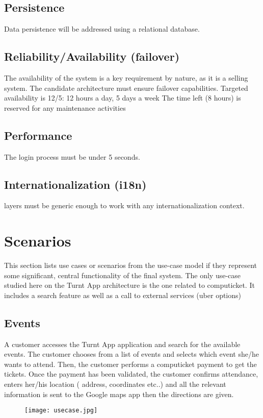 \documentclass[10pt,a4paper]{article}
\begin{document}
\subsection{Persistence }

Data persistence will be addressed using a relational database. 

\subsection{Reliability/Availability (failover)}

The availability of the system is a key requirement by nature, as it is a selling system. The candidate architecture must ensure failover capabilities.
Targeted availability is 12/5: 12 hours a day, 5 days a week 
The time left (8 hours) is reserved for any maintenance activities


\subsection{Performance}

The login process must be under 5 seconds.

\subsection{Internationalization (i18n)}
layers must be generic enough to work with any internationalization context.

\section{Scenarios}
This section lists use cases or scenarios from the use-case model if they represent some significant, central functionality of the final system. The only use-case studied here on the Turnt App architecture is the one related to computicket. It includes a search feature as well as a call to external services (uber options)


\subsection{Events}
	
A customer accesses the Turnt App application and search for the available events.  The customer chooses from a list of events and selects which event she/he wants to attend.  Then, the customer performs a computicket payment to get the tickets. Once the payment has been validated, the customer confirms attendance, enters her/his location ( address, coordinates etc..) and all the relevant information is sent to the Google maps app then the directions are given.
\begin{figure}[H]
\texttt{[image: usecase.jpg]}
\end{figure}
\end{document}
